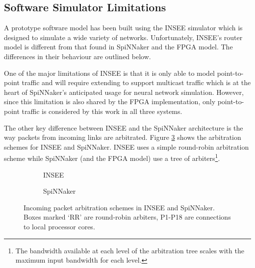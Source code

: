 		\subsection{Software Simulator Limitations}
		
			A prototype software model has been built using the INSEE simulator
			\cite{navaridas11insee} which is designed to simulate a wide variety of
			networks. Unfortunately, INSEE's router model is different from that found
			in SpiNNaker and the FPGA model. The differences in their behaviour are
			outlined below.
			
			
			One of the major limitations of INSEE is that it is only able to model
			point-to-point traffic and will require extending to support multicast
			traffic which is at the heart of SpiNNaker's anticipated usage for neural
			network simulation. However, since this limitation is also shared by the
			FPGA implementation, only point-to-point traffic is considered by this
			work in all three systems.
			
			The other key difference between INSEE and the SpiNNaker architecture is
			the way packets from incoming links are arbitrated. Figure
			\ref{fig:arbitration} shows the arbitration schemes for INSEE and
			SpiNNaker. INSEE uses a simple round-robin arbitration scheme while
			SpiNNaker (and the FPGA model) use a tree of arbiters\footnote{The
			bandwidth available at each level of the arbitration tree scales with the
			maximum input bandwidth for each level.}.
			
			\begin{figure}
				\begin{subfigure}[t]{0.50\textwidth}
					\center
					
					
					\caption{INSEE}
					\label{fig:arbitrationINSEE}
				\end{subfigure}
				\begin{subfigure}[t]{0.50\textwidth}
					\center
					
					
					\caption{SpiNNaker}
					\label{fig:arbitrationSpiNNaker}
				\end{subfigure}
				
				\caption[Incoming packet arbitration schemes in INSEE and
				SpiNNaker.]{Incoming packet arbitration schemes in INSEE and SpiNNaker.
				Boxes marked `RR' are round-robin arbiters, P1-P18 are connections to
				local processor cores.}
				\label{fig:arbitration}
			\end{figure}
			
